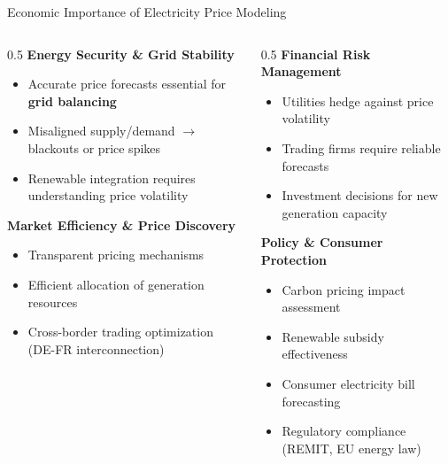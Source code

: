 \documentclass[aspectratio=169]{beamer}
\begin{document}
\begin{frame}{Economic Importance of Electricity Price Modeling}
\begin{columns}
\begin{column}{0.5\textwidth}
\textbf{Energy Security \& Grid Stability}
\begin{itemize}
    \item Accurate price forecasts essential for \textbf{grid balancing}
    \item Misaligned supply/demand $\rightarrow$ blackouts or price spikes
    \item Renewable integration requires understanding price volatility
\end{itemize}

\vspace{0.3cm}
\textbf{Market Efficiency \& Price Discovery}
\begin{itemize}
    \item Transparent pricing mechanisms
    \item Efficient allocation of generation resources
    \item Cross-border trading optimization (DE-FR interconnection)
\end{itemize}
\end{column}

\begin{column}{0.5\textwidth}
\textbf{Financial Risk Management}
\begin{itemize}
    \item Utilities hedge against price volatility
    \item Trading firms require reliable forecasts
    \item Investment decisions for new generation capacity
\end{itemize}

\vspace{0.3cm}
\textbf{Policy \& Consumer Protection}
\begin{itemize}
    \item Carbon pricing impact assessment
    \item Renewable subsidy effectiveness
    \item Consumer electricity bill forecasting
    \item Regulatory compliance (REMIT, EU energy law)
\end{itemize}
\end{column}
\end{columns}
\end{frame}
\end{document}
